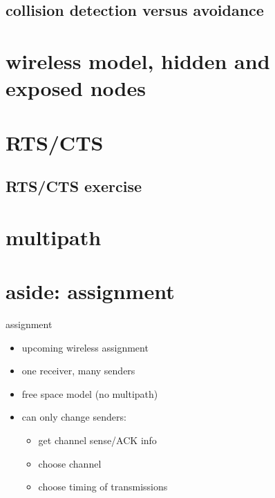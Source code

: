 \subsection{collision detection versus avoidance}



\section{wireless model, hidden and exposed nodes} 


\section{RTS/CTS}


\subsection{RTS/CTS exercise}


\section{multipath}



\section{aside: assignment}
\begin{frame}{assignment}
    \begin{itemize}
    \item upcoming wireless assignment
    \item one receiver, many senders
    \item free space model (no multipath)
    \item can only change senders:
        \begin{itemize}
        \item get channel sense/ACK info
        \item choose channel
        \item choose timing of transmissions
        \end{itemize}
    \end{itemize}
\end{frame}

